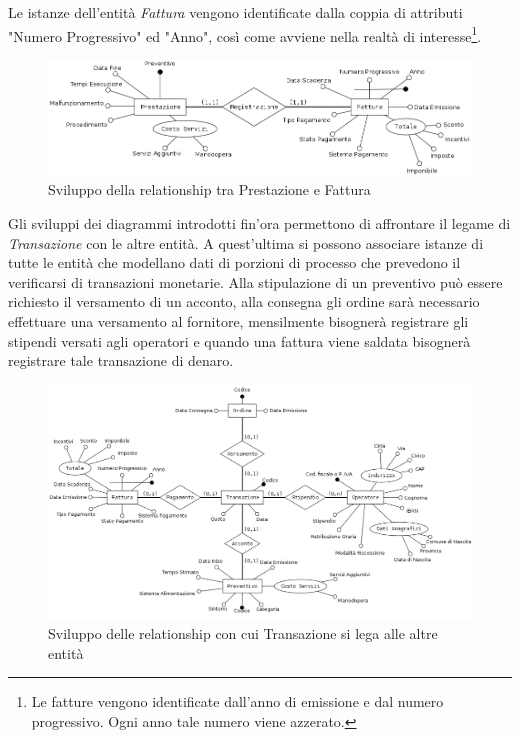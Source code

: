 			Le istanze dell'entità \emph{Fattura} vengono identificate dalla coppia di attributi "Numero Progressivo" ed "Anno", così come avviene nella realtà di interesse\footnote{Le fatture vengono identificate dall'anno di emissione e dal numero progressivo. Ogni anno tale numero viene azzerato.}.
			
			\begin{figure}[H]
				\centering
				\includegraphics[width=11.5cm]{images/finitures/prestazione_fattura.png}
				\caption{Sviluppo della relationship tra Prestazione e Fattura}
				\label{fig:prestazione_fattura}
			\end{figure}
			
			Gli sviluppi dei diagrammi introdotti fin'ora permettono di affrontare il legame di \emph{Transazione} con le altre entità. A quest'ultima si possono associare istanze di tutte le entità che modellano dati di porzioni di processo che prevedono il verificarsi di transazioni monetarie. Alla stipulazione di un preventivo può essere richiesto il versamento di un acconto, alla consegna gli ordine sarà necessario effettuare una versamento al fornitore, mensilmente bisognerà registrare gli stipendi versati agli operatori e quando una fattura viene saldata bisognerà registrare tale transazione di denaro.
			
			\begin{figure}
				\centering
				\includegraphics[width=13cm]{images/finitures/transazione_fattura_preventivo_operatore_ordine.png}
				\caption{Sviluppo delle relationship con cui Transazione si lega alle altre entità}
				\label{fig:transazione_fattura_preventivo_operatore_ordine}
			\end{figure}
			
